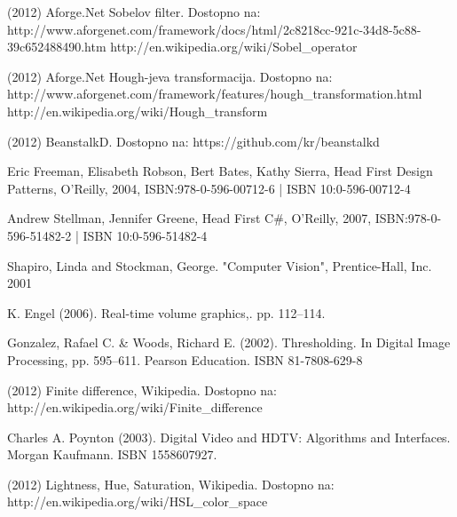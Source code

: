 \documentclass[oneside, a4paper, 12pt]{book}
\begin{document}
\begin{thebibliography}{99}
 (2012) Aforge.Net Sobelov filter. Dostopno na:\\ 
http://www.aforgenet.com/framework/docs/html/2c8218cc-921c-34d8-5c88-39c652488490.htm 
http://en.wikipedia.org/wiki/Sobel\_operator

 (2012) Aforge.Net Hough-jeva transformacija. Dostopno na: 
http://www.aforgenet.com/framework/features/hough\_transformation.html 
http://en.wikipedia.org/wiki/Hough\_transform 

 (2012) BeanstalkD. Dostopno na:  
https://github.com/kr/beanstalkd 

 Eric Freeman, Elisabeth Robson, Bert Bates, Kathy Sierra, Head First Design Patterns, O'Reilly, 2004, ISBN:978-0-596-00712-6 | ISBN 10:0-596-00712-4

 Andrew Stellman, Jennifer Greene, Head First C\#, O'Reilly, 2007, ISBN:978-0-596-51482-2 | ISBN 10:0-596-51482-4

 Shapiro, Linda and Stockman, George. "Computer Vision", Prentice-Hall, Inc. 2001

 K. Engel (2006). Real-time volume graphics,. pp. 112–114.

 Gonzalez, Rafael C. \& Woods, Richard E. (2002). Thresholding. In Digital Image Processing, pp. 595–611. Pearson Education. ISBN 81-7808-629-8

 (2012) Finite difference, Wikipedia. Dostopno na:\\ 
http://en.wikipedia.org/wiki/Finite\_difference

 Charles A. Poynton (2003). Digital Video and HDTV: Algorithms and Interfaces. Morgan Kaufmann. ISBN 1558607927.

 (2012) Lightness, Hue, Saturation, Wikipedia. Dostopno na: \\
http://en.wikipedia.org/wiki/HSL\_color\_space

\end{thebibliography}
\end{document}
